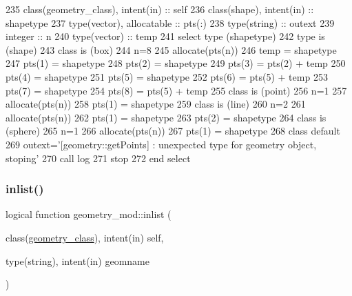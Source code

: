 \begin{DoxyCode}
235     \textcolor{keywordtype}{class}(geometry\_class), \textcolor{keywordtype}{intent(in)} :: self
236     \textcolor{keywordtype}{class}(shape), \textcolor{keywordtype}{intent(in)} :: shapetype
237     \textcolor{keywordtype}{type}(vector), \textcolor{keywordtype}{allocatable} :: pts(:)
238     \textcolor{keywordtype}{type}(string) :: outext
239     \textcolor{keywordtype}{integer} :: n
240     \textcolor{keywordtype}{type}(vector) :: temp
241     \textcolor{keywordflow}{select type} (shapetype)
242 \textcolor{keywordflow}{    type is} (shape)
243 \textcolor{keywordflow}{    class is} (box)
244         n=8
245         \textcolor{keyword}{allocate}(pts(n))
246         temp = shapetype%
247         pts(1) = shapetype%
248         pts(2) = shapetype%
249         pts(3) = pts(2) + temp%
250         pts(4) = shapetype%
251         pts(5) = shapetype%
252         pts(6) = pts(5) + temp%
253         pts(7) = shapetype%
254         pts(8) = pts(5) + temp%
255 \textcolor{keywordflow}{    class is} (point)
256         n=1
257         \textcolor{keyword}{allocate}(pts(n))
258         pts(1) = shapetype%
259 \textcolor{keywordflow}{    class is} (line)
260         n=2
261         \textcolor{keyword}{allocate}(pts(n))
262         pts(1) = shapetype%
263         pts(2) = shapetype%
264 \textcolor{keywordflow}{    class is} (sphere)
265         n=1
266         \textcolor{keyword}{allocate}(pts(n))
267         pts(1) = shapetype%
268 \textcolor{keywordflow}{        class default}
269         outext=\textcolor{stringliteral}{'[geometry::getPoints] : unexpected type for geometry object, stoping'}
270         \textcolor{keyword}{call }log%
271         stop
272 \textcolor{keywordflow}{    end select}
\end{DoxyCode}
\mbox{\label{namespacegeometry__mod_a22dd77024fce56da299445a697256155}} 
\subsubsection{\texorpdfstring{inlist()}{inlist()}}
{\footnotesize\ttfamily logical function geometry\+\_\+mod\+::inlist (\begin{DoxyParamCaption}\item[{class(\mbox{\hyperlink{structgeometry__mod_1_1geometry__class}{geometry\+\_\+class}}), intent(in)}]{self,  }\item[{type(string), intent(in)}]{geomname }\end{DoxyParamCaption})\hspace{0.3cm}{\ttfamily [private]}}



